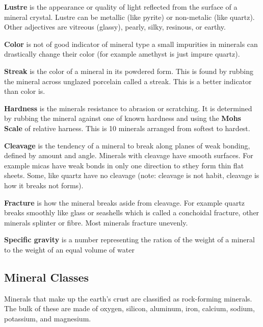\documentclass{article}
\begin{document}
\textbf{Lustre} is the appearance or quality of light reflected from the surface of a mineral crystal. Lustre can be metallic  (like pyrite) or non-metalic (like quartz). Other adjectives are vitreous (glassy), pearly, silky, resinous, or earthy.

\textbf{Color} is not of good indicator of mineral type a small impurities in minerals can drastically change their color (for example amethyst is just impure quartz).

\textbf{Streak} is the color of a mineral in its powdered form. This is found by rubbing the mineral across unglazed porcelain called a streak. This is a better indicator than color is.

\textbf{Hardness} is the minerals resistance to abrasion or scratching. It is determined by rubbing the mineral against one of known hardness and using the \textbf{Mohs Scale} of relative harness. This is 10 minerals arranged from softest to hardest.

\textbf{Cleavage} is the tendency of a mineral to break along planes of weak bonding, defined by amount and angle. Minerals with cleavage have smooth surfaces. For example micas have weak bonds in only one direction to sthey form thin flat sheets. Some, like quartz have no cleavage (note: cleavage is not habit, cleavage is how it breaks not forms).

\textbf{Fracture} is how the mineral breaks aside from cleavage. For example quartz breaks smoothly like glass or seashells which is called a conchoidal fracture, other minerals splinter or fibre. Most minerals fracture unevenly.

\textbf{Specific gravity} is a number representing the ration of the weight of a mineral to the weight of an equal volume of water

\subsection{Mineral Classes} %
\label{sub:mineral_classes}
Minerals that make up the earth's crust are classified as rock-forming minerals. The bulk of these are made of oxygen, silicon, aluminum, iron, calcium, sodium, potassium, and magnesium.
\end{document}
